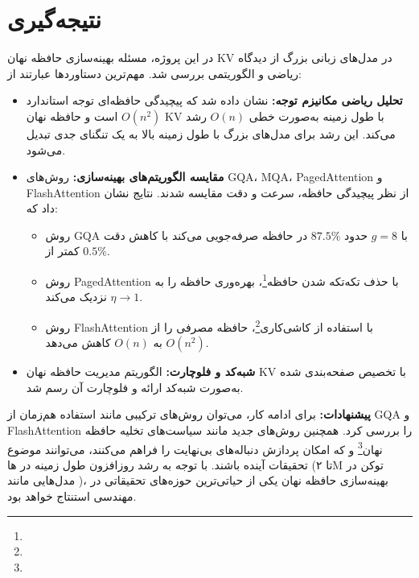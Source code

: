 \chapter{نتیجه‌گیری}
\label{chap:conclusion}

در این پروژه، مسئله بهینه‌سازی حافظه نهان KV در مدل‌های زبانی بزرگ از دیدگاه ریاضی و الگوریتمی بررسی شد. مهم‌ترین دستاوردها عبارتند از:

\begin{itemize}
\item \textbf{تحلیل ریاضی مکانیزم توجه:} نشان داده شد که پیچیدگی حافظه‌ای توجه استاندارد $O(n^2)$ است و حافظه نهان KV با طول زمینه به‌صورت خطی $O(n)$ رشد می‌کند. این رشد برای مدل‌های بزرگ با طول زمینه بالا به یک تنگنای جدی تبدیل می‌شود.
\item \textbf{مقایسه الگوریتم‌های بهینه‌سازی:} روش‌های GQA، MQA، PagedAttention و FlashAttention از نظر پیچیدگی حافظه، سرعت و دقت مقایسه شدند. نتایج نشان داد که:
  \begin{itemize}
  \item روش GQA با $g=8$ حدود $87.5\%$ در حافظه صرفه‌جویی می‌کند با کاهش دقت کمتر از $0.5\%$.
  \item روش PagedAttention با حذف تکه‌تکه شدن حافظه\footnote{}، بهره‌وری حافظه را به $\eta \to 1$ نزدیک می‌کند.
  \item روش FlashAttention با استفاده از کاشی‌کاری\footnote{}، حافظه مصرفی را از $O(n^2)$ به $O(n)$ کاهش می‌دهد.
  \end{itemize}
\item \textbf{شبه‌کد و فلوچارت:} الگوریتم مدیریت حافظه نهان KV با تخصیص صفحه‌بندی شده به‌صورت شبه‌کد ارائه و فلوچارت آن رسم شد.
\end{itemize}

\textbf{پیشنهادات:}
برای ادامه کار، می‌توان روش‌های ترکیبی مانند استفاده هم‌زمان از GQA و FlashAttention را بررسی کرد. همچنین روش‌های جدید مانند سیاست‌های تخلیه حافظه نهان\footnote{} و  \cite{xiao2023streamingllm} که امکان پردازش دنباله‌های بی‌نهایت را فراهم می‌کنند، می‌توانند موضوع تحقیقات آینده باشند. با توجه به رشد روزافزون طول زمینه در ها (تا ۲M توکن در مدل‌هایی مانند )، بهینه‌سازی حافظه نهان  یکی از حیاتی‌ترین حوزه‌های تحقیقاتی در مهندسی استنتاج خواهد بود.
